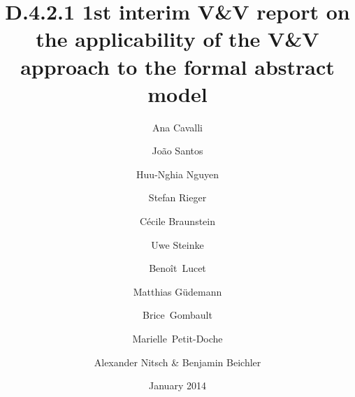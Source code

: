 \documentclass{template/openetcs_article}
\begin{document}
\frontmatter
{}




\title{D.4.2.1 1st interim V\&V report on the applicability of the V\&V approach to the formal abstract model}

\subtitle{}

\date{January 2014}

\author{Ana Cavalli \and João Santos \and Huu-Nghia Nguyen}

  
\author{Stefan Rieger}


\author{Cécile Braunstein}
  
\author{Uwe Steinke}

\author{Benoît~Lucet \and Matthias Güdemann \and Brice~Gombault \and Marielle~Petit-Doche} 


\author{Alexander Nitsch \& Benjamin Beichler}

  

\reporttype{}






\maketitle
\tableofcontents
\listoffiguresandtables
\newpage

\end{document}
